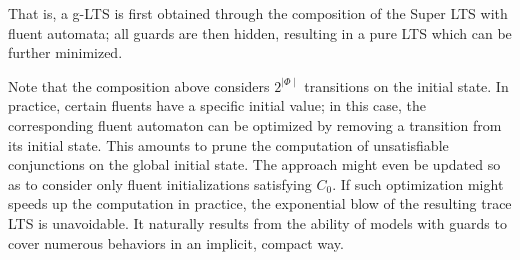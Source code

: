 That is, a g-LTS is first obtained through the composition of the Super LTS with fluent automata; all guards are then hidden, resulting in a pure LTS which can be further minimized.

Note that the composition above considers $2^{\mid\Phi\mid}$ transitions on the initial state. In practice, certain fluents have a specific initial value; in this case, the corresponding fluent automaton can be optimized by removing a transition from its initial state. This amounts to prune the computation of unsatisfiable conjunctions on the global initial state. The approach might even be updated so as to consider only fluent initializations satisfying $C_0$. If such optimization might speeds up the computation in practice, the exponential blow of the resulting trace LTS is unavoidable. It naturally results from the ability of models with guards to cover numerous behaviors in an implicit, compact way. 
